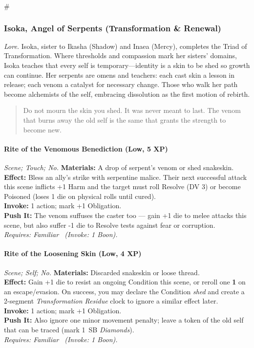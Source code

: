 # %

\subsubsection{Isoka, Angel of Serpents (Transformation \& Renewal)}
\textit{Lore.} Isoka, sister to Ikasha (Shadow) and Inaea (Mercy), completes the Triad of Transformation. Where thresholds and compassion mark her sisters' domains, Isoka teaches that every self is temporary—identity is a skin to be shed so growth can continue. Her serpents are omens and teachers: each cast skin a lesson in release; each venom a catalyst for necessary change. Those who walk her path become alchemists of the self, embracing dissolution as the first motion of rebirth.

\begin{quote}
Do not mourn the skin you shed. It was never meant to last. The venom that burns away the old self is the same that grants the strength to become new.
\end{quote}

\paragraph*{Rite of the Venomous Benediction (Low, 5 XP)} \emph{Scene; Touch; No.}
\textbf{Materials:} A drop of serpent's venom or shed snakeskin.\\
\textbf{Effect:} Bless an ally's strike with serpentine malice. Their next successful attack this scene inflicts +1 Harm and the target must roll Resolve (DV 3) or become Poisoned (loses 1 die on physical rolls until cured).\\
\textbf{Invoke:} 1 action; mark +1 Obligation.\\
\textbf{Push It:} The venom suffuses the caster too — gain +1 die to melee attacks this scene, but also suffer -1 die to Resolve tests against fear or corruption.\\
\emph{Requires: Familiar \ (\textit{Invoke:} 1 Boon).}

\paragraph*{Rite of the Loosening Skin (Low, 4 XP)} \emph{Scene; Self; No.}
\textbf{Materials:} Discarded snakeskin or loose thread.\\
\textbf{Effect:} Gain +1 die to resist an ongoing Condition this scene, or reroll one \textbf{1} on an escape/evasion. On success, you may declare the Condition \emph{shed} and create a 2-segment \emph{Transformation Residue} clock to ignore a similar effect later.\\
\textbf{Invoke:} 1 action; mark +1 Obligation.\\
\textbf{Push It:} Also ignore one minor movement penalty; leave a token of the old self that can be traced (mark 1~SB \emph{Diamonds}).\\
\emph{Requires: Familiar \ (\textit{Invoke:} 1 Boon).}

